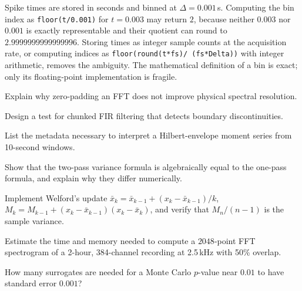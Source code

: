 \begin{workedexample}
Spike times are stored in seconds and binned at $\Delta=0.001$\,s. Computing the bin index as \texttt{floor(t/0.001)} for $t=0.003$ may return $2$, because neither $0.003$ nor $0.001$ is exactly representable and their quotient can round to $2.9999999999999996$. Storing times as integer sample counts at the acquisition rate, or computing indices as \texttt{floor(round(t*fs)/ (fs*Delta))} with integer arithmetic, removes the ambiguity. The mathematical definition of a bin is exact; only its floating-point implementation is fragile.
\end{workedexample}
\begin{exercises}
\item Explain why zero-padding an FFT does not improve physical spectral resolution.
\item Design a test for chunked FIR filtering that detects boundary discontinuities.
\item List the metadata necessary to interpret a Hilbert-envelope moment series from 10-second windows.
\item Show that the two-pass variance formula is algebraically equal to the one-pass formula, and explain why they differ numerically.
\item Implement Welford's update $\bar x_k=\bar x_{k-1}+(x_k-\bar x_{k-1})/k$, $M_k=M_{k-1}+(x_k-\bar x_{k-1})(x_k-\bar x_k)$, and verify that $M_n/(n-1)$ is the sample variance.
\item Estimate the time and memory needed to compute a $2048$-point FFT spectrogram of a 2-hour, 384-channel recording at 2.5\,kHz with 50\% overlap.
\item How many surrogates are needed for a Monte Carlo $p$-value near $0.01$ to have standard error $0.001$?
\end{exercises}

